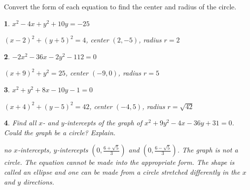 \documentclass{amsbook}
\newtheorem{exc}{}
\newenvironment{ex}{\begin{exc}\normalfont}{\end{exc}}
\numberwithin{section}{chapter}
\numberwithin{equation}{chapter}
\begin{document}
\begin{multicols}{3}
\end{multicols}

Convert the form of each equation to find the center and radius of the circle.

\begin{multicols}{2}
	\begin{ex}
		$x^2-4x+y^2+10y=-25$
		\begin{sol}
			$(x-2)^2+(y+5)^2=4$, center $(2,-5)$, radius $r=2$
		\end{sol}
	\end{ex}
	\begin{ex}
	$-2x^2-36x-2y^2-112=0$
	\begin{sol}
		$(x+9)^2+y^2=25$, center $(-9,0)$, radius $r=5$
	\end{sol}
\end{ex}
	\begin{ex}
	$x^2+y^2+8x-10y-1=0$
	\begin{sol}
		$(x+4)^2+(y-5)^2 = 42$, center $(-4,5)$, radius $r=\sqrt{42}$
	\end{sol}
\end{ex}

\end{multicols}

\begin{ex}
	Find all $x$- and $y$-intercepts of the graph of $ x^2+9y^2-4x-36y+31=0$. Could the graph be a circle? Explain.
	\begin{sol}
		no $x$-intercepts, $y$-intercepts $\left(  0, \frac{6+\sqrt{5}}{3} \right)$ and $\left(  0, \frac{6-\sqrt{5}}{3} \right)$. The graph is not a circle. The equation cannot be made into the appropriate form. The shape is called an ellipse and one can be made from a circle stretched differently in the $x$ and $y$ directions.
	\end{sol}
\end{ex}
\end{document}

